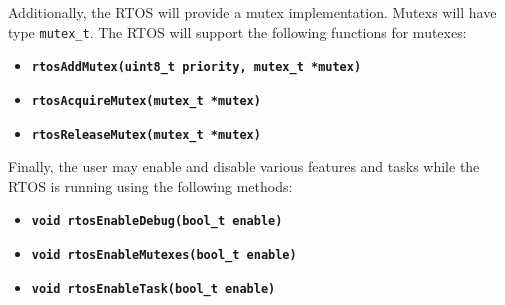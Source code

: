 \documentclass{article}
\newcommand{\bitem}[1]{\item \textbf{#1}}
\begin{document}
        Additionally, the RTOS will provide a mutex implementation. Mutexs will have type \texttt{mutex\_t}. The RTOS will support the following functions for mutexes:
        \begin{itemize}
            \bitem{\texttt{rtosAddMutex(uint8\_t priority, mutex\_t *mutex)}}
            \bitem{\texttt{rtosAcquireMutex(mutex\_t *mutex)}}
            \bitem{\texttt{rtosReleaseMutex(mutex\_t *mutex)}}
        \end{itemize}

        Finally, the user may enable and disable various features and tasks while the RTOS is running using the following methods:
        \begin{itemize}
            \bitem{\texttt{void rtosEnableDebug(bool\_t enable)}}
            \bitem{\texttt{void rtosEnableMutexes(bool\_t enable)}}
            \bitem{\texttt{void rtosEnableTask(bool\_t enable)}}
        \end{itemize}
		
\end{document}
